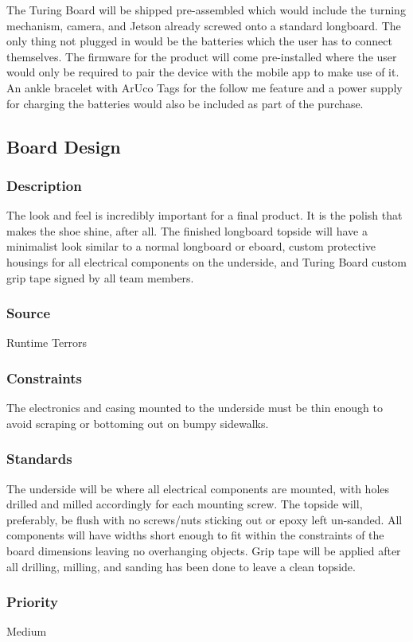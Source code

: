 The Turing Board will be shipped pre-assembled which would include the turning mechanism, camera, and Jetson already screwed onto a standard longboard. The only thing not plugged in would be the batteries which the user has to connect themselves. The firmware for the product will come pre-installed where the user would only be required to pair the device with the mobile app to make use of it. An ankle bracelet with ArUco Tags for the follow me feature and a power supply for charging the batteries would also be included as part of the purchase.

\subsection{Board Design}
\subsubsection{Description}
The look and feel is incredibly important for a final product. It is the polish that makes the shoe shine, after all. The finished longboard topside will have a minimalist look similar to a normal longboard or eboard, custom protective housings for all electrical components on the underside, and Turing Board custom grip tape signed by all team members.
\subsubsection{Source}
Runtime Terrors
\subsubsection{Constraints}
The electronics and casing mounted to the underside must be thin enough to avoid scraping or bottoming out on bumpy sidewalks.
\subsubsection{Standards}
The underside will be where all electrical components are mounted, with holes drilled and milled accordingly for each mounting screw. The topside will, preferably, be flush with no screws/nuts sticking out or epoxy left un-sanded. All components will have widths short enough to fit within the constraints of the board dimensions leaving no overhanging objects. Grip tape will be applied after all drilling, milling, and sanding has been done to leave a clean topside.
\subsubsection{Priority}
Medium

